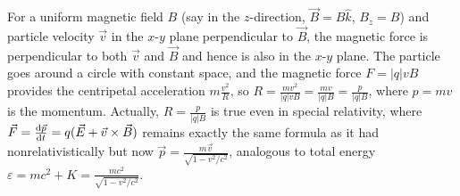 For a uniform magnetic field $B$ (say in the $z$-direction, $\vec{B} = B\hat{k}$, $B_z = B$) and particle velocity $\vec{v}$ in the $x$-$y$ plane perpendicular to $\vec{B}$, the magnetic force is perpendicular to both $\vec{v}$ and $\vec{B}$ and hence is also in the $x$-$y$ plane. The particle goes around a circle with constant space, and the magnetic force $F = |q|vB$ provides the centripetal acceleration $m\frac{v^2}{R}$, so $R = \frac{mv^2}{|q|vB} = \frac{mv}{|q|B} = \frac{p}{|q|B}$, where $p=mv$ is the momentum. Actually, $R = \frac{p}{|q|B}$ is true even in special relativity, where $\vec{F} = \frac{\operatorname{d\!} \vec{p}}{\operatorname{d\!} t} = q(\vec{E} + \vec{v}\times\vec{B})$ remains exactly the same formula as it had nonrelativistically but now $\vec{p} = \frac{m\vec{v}}{\sqrt{1-v^2/c^2}}$, analogous to total energy $\varepsilon = mc^2 + K = \frac{mc^2}{\sqrt{1-v^2/c^2}}$.

